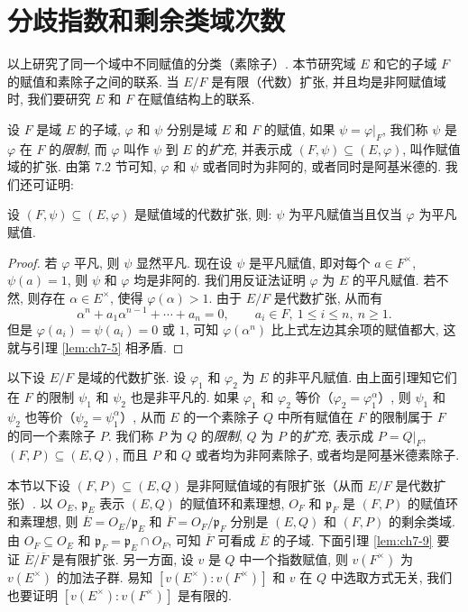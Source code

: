 \section{分歧指数和剩余类域次数}\label{sec:ch7-s4}

以上研究了同一个域中不同赋值的分类（素除子）. 本节研究域 $E$ 和它的子域 $F$ 的赋值和素除子之间的联系. 当 $E/F$ 是有限（代数）扩张, 并且均是非阿赋值域时, 我们要研究 $E$ 和 $F$ 在赋值结构上的联系.

设 $F$ 是域 $E$ 的子域, $\varphi$ 和 $\psi$ 分别是域 $E$ 和 $F$ 的赋值, 如果 $\psi=\varphi|_F$, 我们称 $\psi$ 是 $\varphi$ 在 $F$ 的\emph{限制}, 而 $\varphi$ 叫作 $\psi$ 到 $E$ 的\emph{扩充}, 并表示成 $(F,\psi)\subseteq(E,\varphi)$, 叫作赋值域的扩张. 由第 $7.2$ 节可知, $\varphi$ 和 $\psi$ 或者同时为非阿的, 或者同时是阿基米德的. 我们还可证明:

\begin{lemma}\label{lem:ch7-8}
设 $(F,\psi)\subseteq(E,\varphi)$ 是赋值域的代数扩张, 则: $\psi$ 为平凡赋值当且仅当 $\varphi$ 为平凡赋值.
\end{lemma}

\begin{proof}
若 $\varphi$ 平凡, 则 $\psi$ 显然平凡. 现在设 $\psi$ 是平凡赋值, 即对每个 $a\in F^{\times}$, $\psi(a)=1$, 则 $\psi$ 和 $\varphi$ 均是非阿的. 我们用反证法证明 $\varphi$ 为 $E$ 的平凡赋值. 若不然, 则存在 $\alpha\in E^{\times}$, 使得 $\varphi(\alpha)>1$. 由于 $E/F$ 是代数扩张, 从而有
\[
  \alpha^n+a_1\alpha^{n-1}+\cdots+a_n=0,\qquad a_i\in F,\ 1\leqslant i\leqslant n,\ n\geqslant 1.
\]
但是 $\varphi(a_i)=\psi(a_i)=0$ 或 $1$, 可知 $\varphi(\alpha^n)$ 比上式左边其余项的赋值都大, 这就与引理 \ref{lem:ch7-5} 相矛盾.
\end{proof}

以下设 $E/F$ 是域的代数扩张. 设 $\varphi_1$ 和 $\varphi_2$ 为 $E$ 的非平凡赋值. 由上面引理知它们在 $F$ 的限制 $\psi_1$ 和 $\psi_2$ 也是非平凡的. 如果 $\varphi_1$ 和 $\varphi_2$ 等价（$\varphi_2=\varphi_1^{\alpha}$）, 则 $\psi_1$ 和 $\psi_2$ 也等价（$\psi_2=\psi_1^{\alpha}$）, 从而 $E$ 的一个素除子 $Q$ 中所有赋值在 $F$ 的限制属于 $F$ 的同一个素除子 $P$. 我们称 $P$ 为 $Q$ 的\emph{限制}, $Q$ 为 $P$ 的\emph{扩充}, 表示成 $P=Q|_F$, $(F,P)\subseteq(E,Q)$, 而且 $P$ 和 $Q$ 或者均为非阿素除子, 或者均是阿基米德素除子.

本节以下设 $(F,P)\subseteq(E,Q)$ 是非阿赋值域的有限扩张（从而 $E/F$ 是代数扩张）. 以 $O_E$, $\mathfrak{p}_E$ 表示 $(E,Q)$ 的赋值环和素理想, $O_F$ 和 $\mathfrak{p}_F$ 是 $(F,P)$ 的赋值环和素理想, 则 $\overline{E}=O_E/\mathfrak{p}_E$ 和 $\overline{F}=O_F/\mathfrak{p}_F$ 分别是 $(E,Q)$ 和 $(F,P)$ 的剩余类域. 由 $O_F\subseteq O_E$ 和 $\mathfrak{p}_F=\mathfrak{p}_E\cap O_F$, 可知 $\overline{F}$ 可看成 $\overline{E}$ 的子域. 下面引理 \ref{lem:ch7-9} 要证 $\overline{E}/\overline{F}$ 是有限扩张. 另一方面, 设 $v$ 是 $Q$ 中一个指数赋值, 则 $v(F^{\times})$ 为 $v(E^{\times})$ 的加法子群. 易知 $[v(E^{\times}):v(F^{\times})]$ 和 $v$ 在 $Q$ 中选取方式无关, 我们也要证明 $[v(E^{\times}):v(F^{\times})]$ 是有限的.

